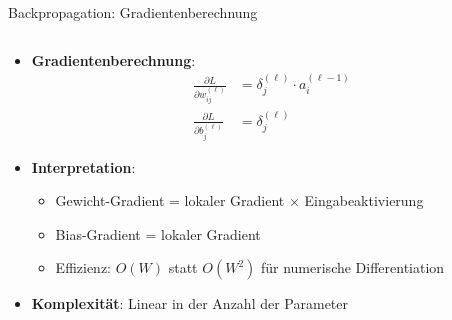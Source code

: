 \documentclass[aspectratio=1610, xcolor=dvipsnames, 9pt]{beamer}
\begin{document}
      \begin{frame}{Backpropagation: Gradientenberechnung}
        \begin{columns}
          \begin{column}{1\textwidth}
            \begin{itemize}
              \item \textbf{Gradientenberechnung}:
              \begin{align}
                \frac{\partial L}{\partial w_{ij}^{(\ell)}} &= \delta_j^{(\ell)} \cdot a_i^{(\ell-1)} \\
                \frac{\partial L}{\partial b_j^{(\ell)}} &= \delta_j^{(\ell)}
              \end{align}
              \item \textbf{Interpretation}:
              \begin{itemize}
                \item Gewicht-Gradient = lokaler Gradient × Eingabeaktivierung
                \item Bias-Gradient = lokaler Gradient
                \item Effizienz: $O(W)$ statt $O(W^2)$ für numerische Differentiation
              \end{itemize}
              \item \textbf{Komplexität}: Linear in der Anzahl der Parameter
            \end{itemize}
          \end{column}
        \end{columns}
      \end{frame}
\end{document}
